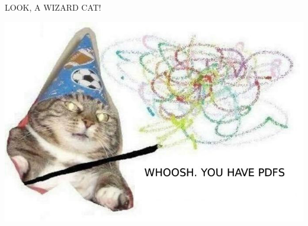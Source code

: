 \documentclass{article}
\begin{document}
LOOK, A WIZARD CAT!

\includegraphics{woosh.jpeg}
\end{document}
